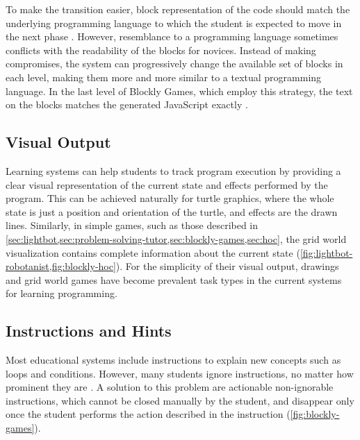 To make the transition easier, block representation of the code
  should match the underlying programming language
  to which the student is expected to move in the next phase
  \cite{challenges-of-blocks-based-environments}.
However, resemblance to a programming language sometimes
  conflicts with the readability of the blocks for novices.
Instead of making compromises,
  the system can progressively change the available set of blocks in each level,
  making them more and more similar to a textual programming language.
In the last level of Blockly Games, which employ this strategy,
  the text on the blocks matches the generated JavaScript exactly
  \cite{blockly-10-things}.



\subsection{Visual Output}
\label{sec:visual-output}

Learning systems can help students to track program execution
  by providing a clear visual representation of the current state
  and effects performed by the program.
This can be achieved naturally for turtle graphics,
  where the whole state is just a position and orientation of the turtle,
  and effects are the drawn lines.
Similarly, in simple games, such as those described in
  \cref{sec:lightbot,sec:problem-solving-tutor,sec:blockly-games,sec:hoc},
  the grid world visualization contains complete information about the current
  state (\cref{fig:lightbot-robotanist,fig:blockly-hoc}).
For the simplicity of their visual output,
  drawings and grid world games have become prevalent task types
  in the current systems for learning programming.

\subsection{Instructions and Hints}
\label{sec:instructions-and-hints}

Most educational systems include instructions
  to explain new concepts such as loops and conditions.
However, many students ignore instructions,
  no matter how prominent they are \cite{blockly-10-things}.
A solution to this problem are actionable non-ignorable instructions,
  which cannot be closed manually by the student, and disappear only once the
  student performs the action described in the instruction
  (\cref{fig:blockly-games}).


